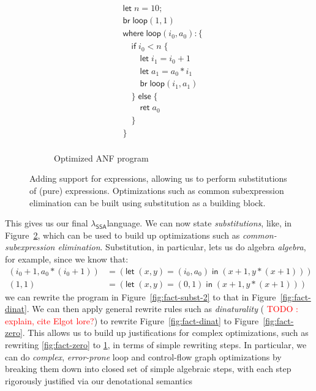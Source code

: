 \documentclass[acmsmall,screen,review]{acmart}
\newcounter{todos}
\newcommand{\todo}[1]{\stepcounter{todos} \textcolor{red}{TODO \arabic{todos}: #1}}
\newcommand{\ms}[1]{\ensuremath{\mathsf{#1}}}
\newcommand{\isotopessa}{\(\lambda_{\ms{SSA}}\)}
\begin{document}
\begin{figure}
\begin{subfigure}[t]{.31\textwidth}
\begin{align*}
      & \ms{let}\;n = 10; \\
      & \ms{br}\;\ms{loop}(1, 1) \\
      & \ms{where}\;\ms{loop}(i_0, a_0): \{\\
      & \quad \ms{if}\;i_0 < n\;\{ \\
      & \qquad \ms{let}\;i_1 = i_0 + 1 \\
      & \qquad \ms{let}\;a_1 = a_0 * i_1 \\
      & \qquad \ms{br}\;\ms{loop}(i_1, a_1) \\
      & \quad \}\;\ms{else}\;\{ \\
      & \qquad \ms{ret}\;a_0 \\
      & \quad \} \\
      & \} \\
    \end{align*}
    \caption{Optimized ANF program}
    \label{fig:fact-opt}
  \end{subfigure}
  \caption{
    Adding support for expressions, allowing us to perform substitutions of (pure) expressions.
    Optimizations such as common subexpression elimination can be built using substitution as a
    building block.
  }
  \Description{}
  \label{fig:fact-cse}
\end{figure}


This gives us our final \isotopessa language. We can now state
\textit{substitutions}, like, in Figure~\ref{fig:fact-cse}, which can be used to
build up optimizations such as \textit{common-subexpression elimination}.
Substitution, in particular, lets us do algebra \textit{algebra}, for example,
since we know that:
\begin{align*}
  (i_0 + 1, a_0 * (i_0 + 1)) &= (\ms{let}\;(x, y) = (i_0, a_0)\;\ms{in}\;(x + 1, y * (x + 1))) \\
  (1, 1) &= (\ms{let}\;(x, y) = (0, 1)\;\ms{in}\;(x + 1, y * (x + 1)))
\end{align*} 
we can rewrite the program in Figure~\ref{fig:fact-subst-2} to that in
Figure~\ref{fig:fact-dinat}. We can then apply general rewrite rules such as
\textit{dinaturality} (\todo{explain, cite Elgot lore?}) to rewrite
Figure~\ref{fig:fact-dinat} to Figure~\ref{fig:fact-zero}. This allows us to
build up justifications for complex optimizations, such as rewriting
\ref{fig:fact-zero} to \ref{fig:fact-opt}, in terms of simple rewriting steps.
In particular, we can do \textit{complex}, \textit{error-prone} loop and
control-flow graph optimizations by breaking them down into closed set of simple
algebraic steps, with each step rigorously justified via our denotational
semantics
\end{document}
